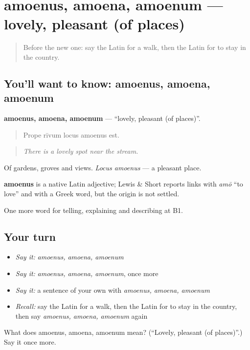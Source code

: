 \section[amoenus, amoena, amoenum]{amoenus, amoena, amoenum — lovely, pleasant (of places)}

\label{lesson:LA-C542-amoenus}



\begin{quote}
Before the new one: say the Latin for a walk, then the Latin for to stay in the country.
\end{quote}

\subsection*{You'll want to know: amoenus, amoena, amoenum}
\textbf{amoenus, amoena, amoenum} — \textquotedblleft{}lovely, pleasant (of places)\textquotedblright{}.

\begin{quote}
Prope rīvum locus amoenus est.
\end{quote}

\begin{quote}
\emph{There is a lovely spot near the stream.}
\end{quote}

Of gardens, groves and views. \emph{Locus amoenus} — a pleasant place.

\begin{cousinweb}
\textbf{amoenus} is a native Latin adjective; Lewis \& Short reports links with \emph{amō} \textquotedblleft{}to love\textquotedblright{} and with a Greek word, but the origin is not settled.
\end{cousinweb}

\begin{grammarlens}[title={What you've built}]
One more word for telling, explaining and describing at B1.
\end{grammarlens}

\subsection*{Your turn}
\begin{itemize}
\raggedright
  \item \emph{Say it:} \emph{amoenus, amoena, amoenum}
  \item \emph{Say it:} \emph{amoenus, amoena, amoenum}, once more
  \item \emph{Say it:} a sentence of your own with \emph{amoenus, amoena, amoenum}
  \item \emph{Recall:} say the Latin for a walk, then the Latin for to stay in the country, then say \emph{amoenus, amoena, amoenum} again
\end{itemize}

\begin{tcolorbox}[breakable,colback=teal!4,colframe=teal!35!black,title={Before you move on}]
What does amoenus, amoena, amoenum mean? (\textquotedblleft{}Lovely, pleasant (of places)\textquotedblright{}.) Say it once more.
\end{tcolorbox}
